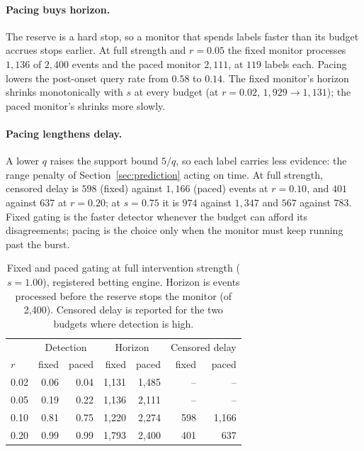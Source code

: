 \paragraph{Pacing buys horizon.}
The reserve is a hard stop, so a monitor that spends labels faster than its budget accrues stops earlier.
At full strength and $r=0.05$ the fixed monitor processes $1{,}136$ of $2{,}400$ events and the paced monitor $2{,}111$, at $119$ labels each.
Pacing lowers the post-onset query rate from $0.58$ to $0.14$.
The fixed monitor's horizon shrinks monotonically with $s$ at every budget (at $r=0.02$, $1{,}929\to1{,}131$); the paced monitor's shrinks more slowly.

\paragraph{Pacing lengthens delay.}
A lower $q$ raises the support bound $5/q$, so each label carries less evidence: the range penalty of Section~\ref{sec:prediction} acting on time.
At full strength, censored delay is $598$ (fixed) against $1{,}166$ (paced) events at $r=0.10$, and $401$ against $637$ at $r=0.20$; at $s=0.75$ it is $974$ against $1{,}347$ and $567$ against $783$.
Fixed gating is the faster detector whenever the budget can afford its disagreements; pacing is the choice only when the monitor must keep running past the burst.

\begin{table}[t]
\centering
\caption{Fixed and paced gating at full intervention strength ($s=1.00$), registered betting engine.
Horizon is events processed before the reserve stops the monitor (of 2{,}400). Censored delay is reported for the two budgets where detection is high.}
\label{tab:pacing}
\begin{tabular}{lrrrrrr}
\toprule
 & \multicolumn{2}{c}{Detection} & \multicolumn{2}{c}{Horizon} & \multicolumn{2}{c}{Censored delay} \\
$r$ & fixed & paced & fixed & paced & fixed & paced \\
\midrule
0.02 & 0.06 & 0.04 & 1{,}131 & 1{,}485 & -- & -- \\
0.05 & 0.19 & 0.22 & 1{,}136 & 2{,}111 & -- & -- \\
0.10 & 0.81 & 0.75 & 1{,}220 & 2{,}274 & 598 & 1{,}166 \\
0.20 & 0.99 & 0.99 & 1{,}793 & 2{,}400 & 401 & 637 \\
\bottomrule
\end{tabular}
\end{table}


